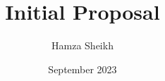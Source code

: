 \documentclass{article}
\title{Initial Proposal}
\author{Hamza Sheikh}
\date{September 2023}
\begin{document}
\maketitle

\tableofcontents
\break











\end{document}
